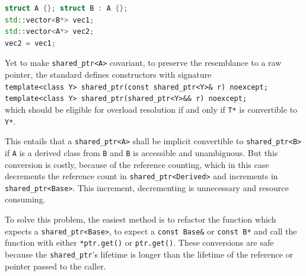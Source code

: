 \begin{lstlisting}[language=c++, frame=single]
struct A {}; struct B : A {};
std::vector<B*> vec1;
std::vector<A*> vec2;
vec2 = vec1;
\end{lstlisting}
\par Yet to make \verb|shared_ptr<A>| covariant, to preserve the resemblance to a raw pointer, the standard defines constructors with signature
\\ \verb|template<class Y> shared_ptr(const shared_ptr<Y>& r) noexcept;|\\
\verb|template<class Y> shared_ptr(shared_ptr<Y>&& r) noexcept;| \\
\cite[\S20.8.2.2.1]{cpp_standard}
which should be eligible for overload resolution if and only if \verb|T*| is convertible to \verb|Y*|. \medskip
\par This entails that a \verb|shared_ptr<A>| shall be implicit convertible to \verb|shared_ptr<B>| if \verb|A| is a derived class from \verb|B| and \verb|B| is accessible and unambiguous. But this conversion is costly, because of the reference counting, which in this case decrements the reference count in \verb|shared_ptr<Derived>| and increments in \verb|shared_ptr<Base>|. This increment, decrementing is unnecessary and resource consuming. \medskip
\par To solve this problem, the easiest method is to refactor the function which expects a \verb|shared_ptr<Base>|, to expect a \verb|const Base&| or \verb|const B*| and call the function with either \verb|*ptr.get()| or \verb|ptr.get()|. These conversions are safe because the \verb|shared_ptr|'s lifetime is longer than the lifetime of the reference or pointer passed to the caller.
